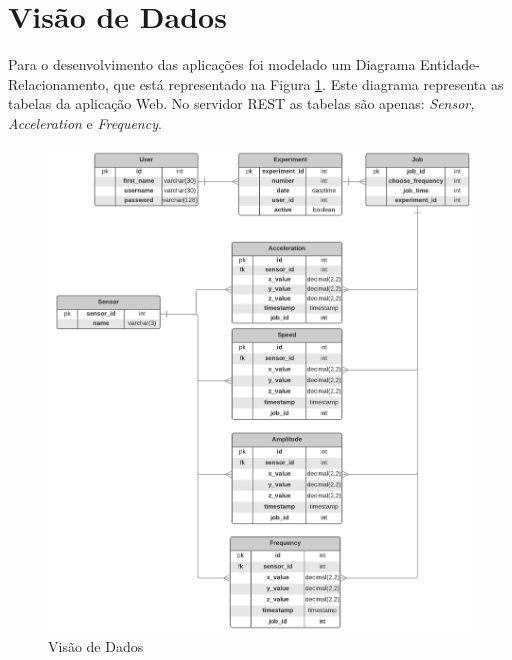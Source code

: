     
\section*{Visão de Dados}

Para o desenvolvimento das aplicações foi modelado um Diagrama Entidade-Relacionamento, que está representado na Figura \ref{fig:visao_de_dados}.
Este diagrama representa as tabelas da aplicação Web. No servidor REST as tabelas são apenas: \textit{Sensor, Acceleration} e \textit{Frequency}.

\begin{figure}[!ht]
\centering
\includegraphics[keepaspectratio=true,scale=0.4]{figuras/visao_de_dados.png}
\caption{Visão de Dados}
\label{fig:visao_de_dados} 
\end{figure} 

    